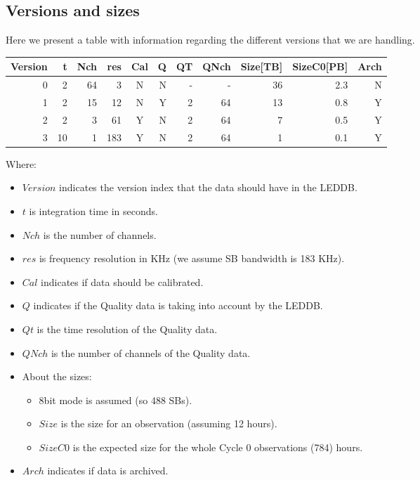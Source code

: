 \documentclass[a4paper,11pt]{article}
\begin{document}
\subsection*{Versions and sizes}

Here we present a table with information regarding the different versions that we are handling.

\vspace{10pt}

\begin{small}
\begin{tabular}{r|rrrcrrrrrr}
	\hline
Version & t  & Nch & res  & Cal          & Q & QT & QNch & Size[TB] & SizeC0[PB] & Arch  \\
	\hline
0 		& 2  & 64  & 3    & N            & N & -  & -    & 36       & 2.3           & N  \\
1 		& 2  & 15  & 12   & N            & Y & 2  & 64   & 13       & 0.8           & Y  \\
2 		& 2  & 3   & 61   & Y 	         & N & 2  & 64    & 7        & 0.5           & Y  \\
3 		& 10 & 1   & 183  & Y            & N & 2  & 64    & 1        & 0.1           & Y  \\
	\hline
\end{tabular}
\end{small}

\vspace{5pt}

Where:
\begin{itemize}
\item $Version$ indicates the version index that the data should have in the LEDDB.
\item $t$ is integration time in seconds.
\item $Nch$ is the number of channels.
\item $res$ is frequency resolution in KHz (we assume SB bandwidth is 183 KHz).
\item $Cal$ indicates if data should be calibrated.
\item $Q$ indicates if the Quality data is taking into account by the LEDDB.
\item $Qt$ is the time resolution of the Quality data.
\item $QNch$ is the number of channels of the Quality data.
\item About the sizes:
\begin{itemize}
\item 8bit mode is assumed (so 488 SBs).
\item $Size$ is the size for an observation (assuming 12 hours).
\item $SizeC0$ is the expected size for the whole Cycle 0 observations (784) hours.
\end{itemize}
\item $Arch$ indicates if data is archived.
\end{itemize}
\end{document}
